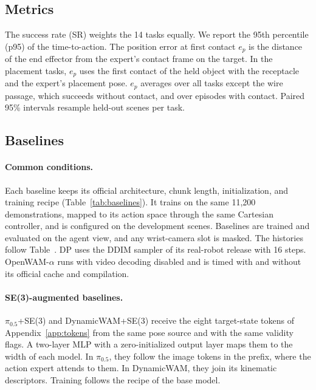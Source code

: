 \subsection{Metrics}
\label{app:metrics}
\label{app:statistics}
The success rate (SR) weights the 14 tasks equally. We report the 95th percentile (p95) of the time-to-action. The position error at first contact $e_p$ is the distance of the end effector from the expert's contact frame on the target. In the placement tasks, $e_p$ uses the first contact of the held object with
the receptacle and the expert's placement pose. $e_p$ averages over all tasks
except the wire passage, which succeeds without contact, and over episodes with contact. Paired 95\% intervals resample held-out scenes per task.

\subsection{Baselines}
\label{app:baselines}
\paragraph{Common conditions.}
Each baseline keeps its official architecture, chunk length, initialization, and
training recipe (Table~\ref{tab:baselines}). It trains on the same 11{,}200
demonstrations, mapped to its action space through the same Cartesian controller, and
is configured on the development scenes. Baselines are trained and evaluated on the
agent view, and any wrist-camera slot is masked. The histories follow
Table~. DP uses the DDIM sampler of its
real-robot release with 16 steps. OpenWAM-$\alpha$ runs with video decoding disabled and
is timed with and without its official cache and compilation.

\paragraph{SE(3)-augmented baselines.}
$\pi_{0.5}$+SE(3) and DynamicWAM+SE(3) receive the eight target-state tokens of
Appendix~\ref{app:tokens} from the same pose source and with the same validity flags. A
two-layer MLP with a zero-initialized output layer maps them to the width of each model.
In $\pi_{0.5}$, they follow the image tokens in the prefix, where the action expert
attends to them. In DynamicWAM, they join its kinematic descriptors. Training follows
the recipe of the base model.
